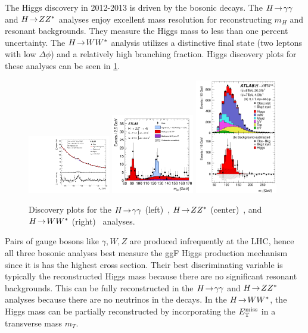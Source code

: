 The Higgs discovery in 2012-2013 is driven by the bosonic decays. The $H \!\rightarrow\! \gamma\gamma$ and $H \!\rightarrow\! ZZ^\ast$ analyses enjoy excellent mass resolution for reconstructing $m_H$ and resonant backgrounds. They measure the Higgs mass to less than one percent uncertainty. The $H \!\rightarrow\! WW^\ast$ analysis utilizes a distinctive final state (two leptons with low $\Delta\phi$) and a relatively high branching fraction. Higgs discovery plots for these analyses can be seen in \cref{fig:strategy-higgs-yyzzww}.

\begin{figure}[tp]
  \centering
  \includegraphics[width=0.32\textwidth]{figures/HIGG-2013-08/fig_13}
  \includegraphics[width=0.32\textwidth]{figures/HIGG-2013-21/fig_13a}
  \includegraphics[width=0.32\textwidth]{figures/HIGG-2013-13/fig_35}
  \caption{Discovery plots for the $H \!\rightarrow\! \gamma\gamma$ (left)~\cite{HIGG-2013-08}, $H \!\rightarrow\! ZZ^\ast$ (center)~\cite{HIGG-2013-21}, and $H \!\rightarrow\! WW^\ast$ (right)~\cite{HIGG-2013-13} analyses.}
  \label{fig:strategy-higgs-yyzzww}
\end{figure}

Pairs of gauge bosons like $\gamma, W, Z$ are produced infrequently at the LHC, hence all three bosonic analyses best measure the ggF Higgs production mechanism since it is has the highest cross section. Their best discriminating variable is typically the reconstructed Higgs mass because there are no significant resonant backgrounds. This can be fully reconstructed in the $H \!\rightarrow\! \gamma\gamma$ and $H \!\rightarrow\! ZZ^\ast$ analyses because there are no neutrinos in the decays. In the $H \!\rightarrow\! WW^\ast$, the Higgs mass can be partially reconstructed by incorporating the $E_{\mathrm{T}}^{\mathrm{miss}}$ in a transverse mass $m_T$.

